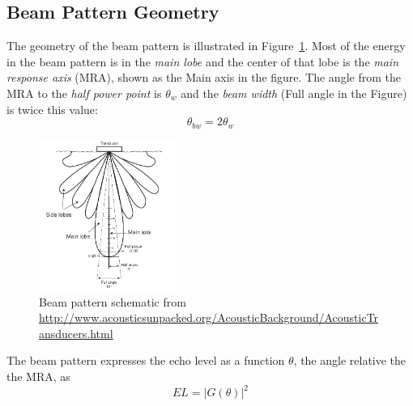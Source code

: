 \documentclass[11pt]{article}
\begin{document}
\subsection{Beam Pattern Geometry}
The geometry of the beam pattern is illustrated in Figure~\ref{f:bpattern}.  Most of the energy in the beam pattern is in the \emph{main lobe} and the center of that lobe is the \emph{main response axis} (MRA), shown as the Main axis in the figure. The angle from the MRA to the \emph{half power point} is $\theta_w$ and the \emph{beam width} (Full angle in the Figure) is twice this value:
\begin{equation}
\theta_{bw}=2 \theta_w
\end{equation}

\begin{figure}[hbt!]
  \centering
  \includegraphics[width=0.4\textwidth]{images/beampattern.png}
  \caption{Beam pattern schematic from \url{http://www.acousticsunpacked.org/AcousticBackground/AcousticTransducers.html}}
  \label{f:bpattern}
\end{figure}
The beam pattern expresses the echo level as a function $\theta$, the angle relative the the MRA, as
\begin{equation}
EL = \left| G(\theta) \right|^2
\end{equation}
\end{document}
